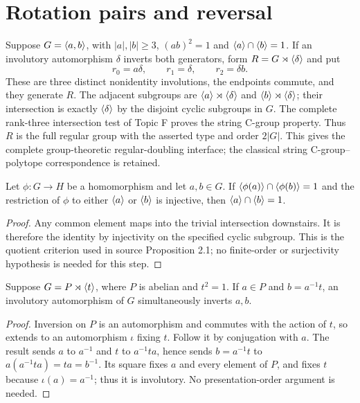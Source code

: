 \section{Rotation pairs and reversal}
Suppose $G=\langle a,b\rangle$, with $|a|,|b|\geq3$,
$(ab)^2=1$ and $\langle a\rangle\cap\langle b\rangle=1$.
If an involutory automorphism $\delta$ inverts both generators,
form $R=G\rtimes\langle \delta\rangle$ and put
\[
r_0=a\delta,\qquad r_1=\delta,\qquad r_2=\delta b.
\]
These are three distinct nonidentity involutions, the endpoints
commute, and they generate $R$. The adjacent subgroups are
$\langle a\rangle\rtimes\langle \delta\rangle$ and $\langle b\rangle\rtimes\langle \delta\rangle$;
their intersection is exactly $\langle \delta\rangle$ by the disjoint
cyclic subgroups in $G$. The complete rank-three intersection test
of Topic F proves the string C-group property. Thus $R$ is the
full regular group with the asserted type and order $2|G|$.
This gives the complete group-theoretic regular-doubling interface;
the classical string C-group--polytope correspondence is retained.


\begin{lemma}\label{UF.CyclicQuotient}
Let $\phi:G\to H$ be a homomorphism and let $a,b\in G$.
If $\langle \phi(a)\rangle\cap\langle \phi(b)\rangle=1$ and the restriction of
$\phi$ to either $\langle a\rangle$ or $\langle b\rangle$ is injective, then
$\langle a\rangle\cap\langle b\rangle=1$.
\end{lemma}
\begin{proof}
Any common element maps into the trivial intersection downstairs.
It is therefore the identity by injectivity on the specified cyclic
subgroup. This is the quotient criterion used in source Proposition 2.1;
no finite-order or surjectivity hypothesis is needed for this step.
\end{proof}

\begin{lemma}\label{lem:abelian}
Suppose $G=P\rtimes\langle t\rangle$, where $P$ is abelian and $t^2=1$.
If $a\in P$ and $b=a^{-1}t$, an involutory automorphism of $G$
simultaneously inverts $a,b$.
\end{lemma}
\begin{proof}
Inversion on $P$ is an automorphism and commutes with the action
of $t$, so extends to an automorphism $\iota$ fixing $t$.
Follow it by conjugation with $a$. The result sends $a$ to $a^{-1}$
and $t$ to $a^{-1}ta$, hence sends $b=a^{-1}t$ to
$a(a^{-1}ta)=ta=b^{-1}$. Its square fixes $a$ and every element
of $P$, and fixes $t$ because $\iota(a)=a^{-1}$; thus it is
involutory. No presentation-order argument is needed.
\end{proof}

